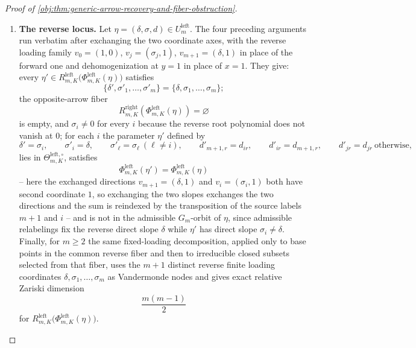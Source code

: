 \begin{proof}[Proof of \cref{obj:thm:generic-arrow-recovery-and-fiber-obstruction}]
\begin{enumerate}
\item \textbf{The reverse locus.}  Let \(\eta=(\delta,\sigma,d)\in U^{\mathrm{left}}_m\).  The four preceding arguments run verbatim after exchanging the two coordinate axes, with the reverse loading family \(v_0=(1,0)\), \(v_j=(\sigma_j,1)\), \(v_{m+1}=(\delta,1)\) in place of the forward one and dehomogenization at \(y=1\) in place of \(x=1\).  They give: every \(\eta'\in R^{\mathrm{left}}_{m,K}\bigl(\Phi^{\mathrm{left}}_{m,K}(\eta)\bigr)\) satisfies
\[
\{\delta',\sigma'_1,\ldots,\sigma'_m\}=\{\delta,\sigma_1,\ldots,\sigma_m\};
\]
the opposite-arrow fiber
\[
R^{\mathrm{right}}_{m,K}\!\left(\Phi^{\mathrm{left}}_{m,K}(\eta)\right)=\varnothing
\]
is empty, and \(\sigma_i\ne0\) for every \(i\) because the reverse root polynomial does not vanish at \(0\); for each \(i\) the parameter \(\eta'\) defined by
\[
\delta'=\sigma_i,\qquad \sigma'_i=\delta,\qquad \sigma'_\ell=\sigma_\ell\ (\ell\ne i),
\qquad
d'_{m+1,r}=d_{ir},\qquad d'_{ir}=d_{m+1,r},\qquad d'_{jr}=d_{jr}\ \text{otherwise},
\]
lies in \(\Theta^{\mathrm{left},\circ}_{m,K}\), satisfies
\[
\Phi^{\mathrm{left}}_{m,K}(\eta')=\Phi^{\mathrm{left}}_{m,K}(\eta)
\]
-- here the exchanged directions \(v_{m+1}=(\delta,1)\) and \(v_i=(\sigma_i,1)\) both have second coordinate \(1\), so exchanging the two slopes exchanges the two directions and the sum is reindexed by the transposition of the source labels \(m+1\) and \(i\) -- and is not in the admissible \(G_m\)-orbit of \(\eta\), since admissible relabelings fix the reverse direct slope \(\delta\) while \(\eta'\) has direct slope \(\sigma_i\ne\delta\).  Finally, for \(m\ge2\) the same fixed-loading decomposition, applied only to base points in the common reverse fiber and then to irreducible closed subsets selected from that fiber, uses the \(m+1\) distinct reverse finite loading coordinates \(\delta,\sigma_1,\ldots,\sigma_m\) as Vandermonde nodes and gives exact relative Zariski dimension
\[
\frac{m(m-1)}{2}
\]
for \(R^{\mathrm{left}}_{m,K}\bigl(\Phi^{\mathrm{left}}_{m,K}(\eta)\bigr)\).
\end{enumerate}
\end{proof}

